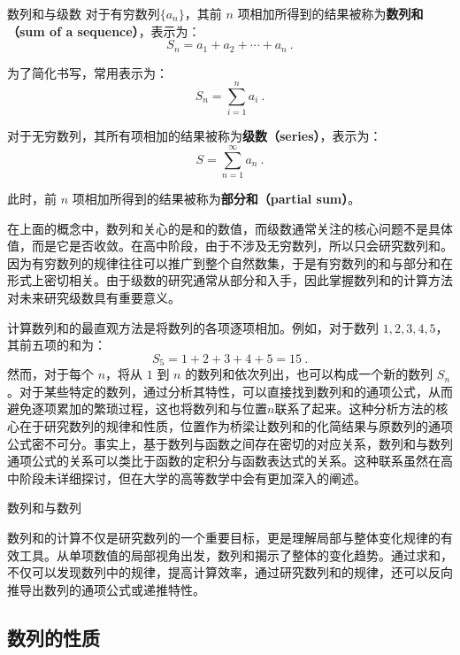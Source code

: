\begin{definition}{数列和与级数}
对于有穷数列$\{a_n\}$，其前 $n$ 项相加所得到的结果被称为\textbf{数列和（sum of a sequence）}，表示为：
\begin{equation}
S_n = a_1 + a_2 + \cdots + a_n~.
\end{equation}

为了简化书写，常用表示为：
\begin{equation}
S_n = \sum_{i=1}^n a_i~.
\end{equation}

对于无穷数列，其所有项相加的结果被称为\textbf{级数（series）}，表示为：
\begin{equation}
S = \sum_{n=1}^\infty a_n~.
\end{equation}

此时，前 $n$ 项相加所得到的结果被称为\textbf{部分和（partial sum）}。
\end{definition}

在上面的概念中，数列和关心的是和的数值，而级数通常关注的核心问题不是具体值，而是它是否收敛。在高中阶段，由于不涉及无穷数列，所以只会研究数列和。因为有穷数列的规律往往可以推广到整个自然数集，于是有穷数列的和与部分和在形式上密切相关。由于级数的研究通常从部分和入手，因此掌握数列和的计算方法对未来研究级数具有重要意义。

计算数列和的最直观方法是将数列的各项逐项相加。例如，对于数列 $1, 2, 3, 4, 5$，其前五项的和为：
$$
S_5 = 1 + 2 + 3 + 4 + 5 = 15~.
$$
然而，对于每个 $n$，将从 $1$ 到 $n$ 的数列和依次列出，也可以构成一个新的数列 ${S_n}$。对于某些特定的数列，通过分析其特性，可以直接找到数列和的通项公式，从而避免逐项累加的繁琐过程，这也将数列和与位置$n$联系了起来。这种分析方法的核心在于研究数列的规律和性质，位置作为桥梁让数列和的化简结果与原数列的通项公式密不可分。事实上，基于数列与函数之间存在密切的对应关系，数列和与数列通项公式的关系可以类比于函数的定积分与函数表达式的关系。这种联系虽然在高中阶段未详细探讨，但在大学的高等数学中会有更加深入的阐述。

数列和与数列

数列和的计算不仅是研究数列的一个重要目标，更是理解局部与整体变化规律的有效工具。从单项数值的局部视角出发，数列和揭示了整体的变化趋势。通过求和，不仅可以发现数列中的规律，提高计算效率，通过研究数列和的规律，还可以反向推导出数列的通项公式或递推特性。

\subsection{数列的性质}

